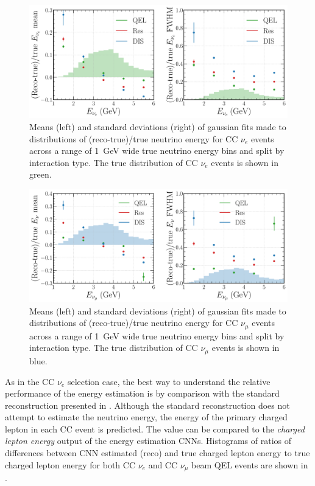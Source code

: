 \begin{figure} %
    \includegraphics[width=\textwidth]{diagrams/7-results/final_energy_nuel.pdf}
    \caption[Means and standard deviations of fits to $\nu_{e}$ energy distributions]
    {Means (left) and standard deviations (right) of gaussian fits made to distributions of
        (reco-true)/true neutrino energy for CC $\nu_{e}$ events across a range of \SI{1}{GeV}
        wide true neutrino energy bins and split by interaction type. The true distribution of CC
        $\nu_{e}$ events is shown in green.}
    \label{fig:final_energy_nuel}
\end{figure}

\begin{figure} %
    \includegraphics[width=\textwidth]{diagrams/7-results/final_energy_numu.pdf}
    \caption[Means and standard deviations of fits to $\nu_{\mu}$ energy distributions]
    {Means (left) and standard deviations (right) of gaussian fits made to distributions of
        (reco-true)/true neutrino energy for CC $\nu_{\mu}$ events across a range of \SI{1}{GeV}
        wide true neutrino energy bins and split by interaction type. The true distribution of CC
        $\nu_{\mu}$ events is shown in blue.}
    \label{fig:final_energy_numu}
\end{figure}

As in the CC $\nu_{e}$ selection case, the best way to understand the relative performance of the
energy estimation is by comparison with the standard \chips reconstruction presented in
. Although the standard reconstruction does not attempt to estimate
the neutrino energy, the energy of the primary charged lepton in each CC event is predicted. The
value can be compared to the \emph{charged lepton energy} output of the energy estimation CNNs.
Histograms of ratios of differences between CNN estimated (reco) and true charged lepton energy to
true charged lepton energy for both CC $\nu_{e}$ and CC $\nu_{\mu}$ beam QEL events are shown in
.

